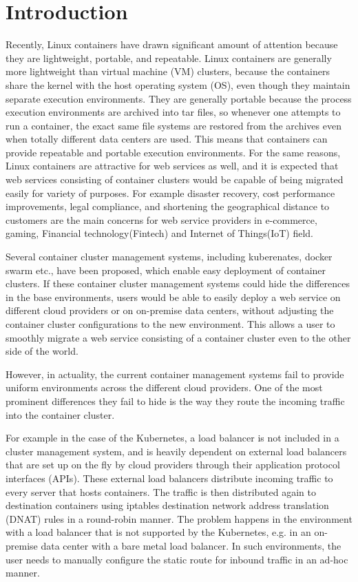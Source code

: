 \section{Introduction}

Recently, Linux containers have drawn significant amount of attention because they are lightweight, portable, and repeatable.
Linux containers are generally more lightweight than virtual machine (VM) clusters, 
because the containers share the kernel with the host operating system (OS), even though they maintain separate execution environments. 
They are generally portable because the process execution environments are archived into tar files, 
so whenever one attempts to run a container, the exact same file systems are restored from the archives 
even when totally different data centers are used. 
This means that containers can provide repeatable and portable execution environments.
%
For the same reasons, Linux containers are attractive for web services as well, 
and it is expected that web services consisting of container clusters would be 
capable of being migrated easily for variety of purposes. For example disaster recovery, 
cost performance improvements, legal compliance, and shortening the geographical distance to customers 
are the main concerns for web service providers in e-commerce, gaming, Financial technology(Fintech) and Internet of Things(IoT) field.
%

Several container cluster management systems, including kuberenates, docker swarm etc.,  have been proposed, which  
enable easy deployment of container clusters.
If these container cluster management systems could hide the differences in the base environments, users would be able to easily deploy a web service on different cloud providers or on on-premise data centers, without adjusting the container cluster configurations to the new environment. 
This allows a user to smoothly migrate a web service consisting of a container cluster even to the other side of the world. 

However, in actuality, the current container management systems fail to provide uniform environments across the different cloud providers. 
One of the most prominent differences they fail to hide is the way they route the incoming traffic into the container cluster.

For example in the case of the Kubernetes, a load balancer is not included in a cluster management system, and is heavily dependent on external load balancers that are set up on the fly 
by cloud providers through their application protocol interfaces (APIs). 
These external load balancers distribute incoming traffic to every server that hosts containers.
The traffic is then distributed again to destination containers using iptables destination 
network address translation (DNAT)\cite{MartinA.Brown2017,Marmol2015} rules in a round-robin manner. 
The problem happens in the environment with a load balancer that is not supported by the Kubernetes, 
e.g. in an on-premise data center with a bare metal load balancer. 
In such environments, the user needs to manually configure 
the static route for inbound traffic in an ad-hoc manner. 

